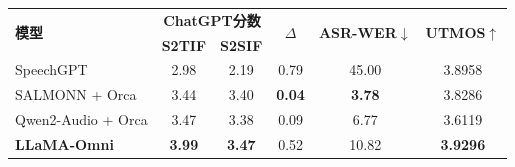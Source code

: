 \begin{table}[!htbp]
    \label{tab:llamaomni_offline}
    \centering
    \small
    \begin{tabular}{lccccc}
        \toprule
        \multirow{2}{*}{\textbf{模型}} & \multicolumn{2}{c}{\textbf{ChatGPT分数}} & \multirow{2}{*}{\textbf{$\Delta$}} & \multirow{2}{*}{\textbf{ASR-WER$\downarrow$}} & \multirow{2}{*}{\textbf{UTMOS$\uparrow$}} \\
        & \textbf{S2TIF} & \textbf{S2SIF} & & & \\
        \midrule
        SpeechGPT & 2.98 & 2.19 & 0.79 & 45.00 & 3.8958 \\
        SALMONN + Orca & 3.44 & 3.40 & \textbf{0.04} & \textbf{3.78} & 3.8286 \\
        Qwen2-Audio + Orca & 3.47 & 3.38 & 0.09 & 6.77 & 3.6119 \\
        \textbf{LLaMA-Omni} & \textbf{3.99} & \textbf{3.47} & 0.52 & 10.82 & \textbf{3.9296} \\
        \bottomrule
    \end{tabular}
\end{table}
